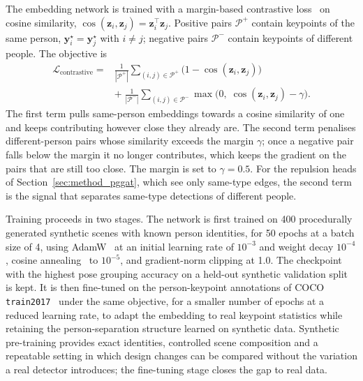 The embedding network is trained with a margin-based contrastive loss~\citep{chopra2005contrastive} on cosine similarity,
$\cos(\mathbf{z}_i,\mathbf{z}_j) = \mathbf{z}_i^\top \mathbf{z}_j$.
Positive pairs $\mathcal{P}^{+}$ contain keypoints of the same person,
$\mathbf{y}^\star_i = \mathbf{y}^\star_j$ with $i \neq j$;
negative pairs $\mathcal{P}^{-}$ contain keypoints of different people.
The objective is
\begin{align}
    \mathcal{L}_{\text{contrastive}}
    =
    &\frac{1}{|\mathcal{P}^{+}|}
    \sum_{(i,j) \in \mathcal{P}^{+}}
    \bigl(
        1 - \cos(\mathbf{z}_i,\mathbf{z}_j)
    \bigr) \nonumber \\
    &+\;
    \frac{1}{|\mathcal{P}^{-}|}
    \sum_{(i,j) \in \mathcal{P}^{-}}
    \max\!\bigl(
        0,\;
        \cos(\mathbf{z}_i,\mathbf{z}_j) - \gamma
    \bigr).
    \label{eq:contrastive_loss}
\end{align}
The first term pulls same-person embeddings towards a cosine similarity of one
and keeps contributing however close they already are.
The second term penalises different-person pairs whose similarity exceeds the margin $\gamma$;
once a negative pair falls below the margin it no longer contributes,
which keeps the gradient on the pairs that are still too close.
The margin is set to $\gamma=0.5$.
For the repulsion heads of Section~\ref{sec:method_pggat}, which see only same-type edges,
the second term is the signal that separates same-type detections of different people.

Training proceeds in two stages.
The network is first trained on 400 procedurally generated synthetic scenes with known person identities,
for 50 epochs at a batch size of 4,
using AdamW~\citep{loshchilov2019adamw} at an initial learning rate of $10^{-3}$ and weight decay $10^{-4}$,
cosine annealing~\citep{loshchilov2017cosineannealing} to $10^{-5}$,
and gradient-norm clipping at 1.0.
The checkpoint with the highest pose grouping accuracy on a held-out synthetic validation split is kept.
It is then fine-tuned on the person-keypoint annotations of COCO \texttt{train2017}~\citep{lin2014coco} under the same
objective, for a smaller number of epochs at a reduced learning rate,
to adapt the embedding to real keypoint statistics while retaining the person-separation structure learned on synthetic
data.
Synthetic pre-training provides exact identities, controlled scene composition and a repeatable setting in
which design changes can be compared without the variation a real detector introduces;
the fine-tuning stage closes the gap to real data.

